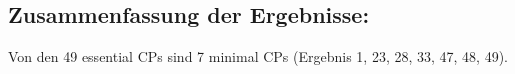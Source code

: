 \documentclass[12pt]{article}
\begin{document}
%
%
%	

	\subsection{Zusammenfassung der Ergebnisse:}
	Von den 49 essential CPs sind 7 minimal CPs (Ergebnis 1, 23, 28, 33, 47, 48, 49).
\end{document}
